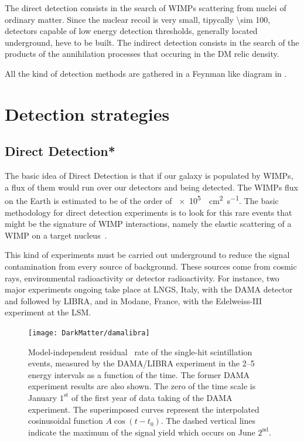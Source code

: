 The direct detection consists in the search of WIMPs scattering from nuclei of ordinary matter. Since the nuclear recoil is very small, tipycally \SI{\sim 100}{\kev}, detectors capable of low energy detection thresholds, generally located underground, heve to be built. The indirect detection consists in the search of the products of the annihilation processes that occuring in the DM relic density.

All the kind of detection methods are gathered in a Feynman like diagram in \Fig{\ref{fig:detection}}.

\section{Detection strategies}

\subsection{Direct Detection*}
The basic idea of Direct Detection is that if our galaxy is populated by WIMPs, a flux of them would run over our detectors and being detected. The WIMPs flux on the Earth is estimated to be of the order of \SI{e5}{\per \cm\squared\per\s}. The basic methodology for direct detection experiments is to look for this rare events that might be the signature of WIMP interactions, namely the elastic scattering of a WIMP on a target nucleus~\cite{snowmass}.

This kind of experiments must be carried out underground to reduce the signal contamination from every source of background. These sources come from cosmic rays, environmental radioactivity or detector radioactivity. For instance, two major experiments ongoing take place at LNGS, Italy, with the DAMA detector and followed by LIBRA, and in Modane, France, with the Edelweiss-III experiment at the LSM.
\begin{figure}[t]
\centering
\texttt{[image: DarkMatter/damalibra]}
\caption{Model-independent residual~\cite{damalibra} rate of the single-hit scintillation events, measured by the DAMA/LIBRA experiment in the \SIrange{2}{5}{\kev} energy intervals as a function of the time. The former DAMA experiment results are also shown. The zero of the time scale is January $1^{\text{st}}$ of the first year of data taking of the DAMA experiment. The superimposed curves represent the interpolated cosinusoidal function $A\cos{(t-t_0)}$. The dashed vertical lines indicate the maximum of the signal yield which occurs on June $2^{\text{nd}}$.}

\label{fig:damalibra}
\end{figure}

